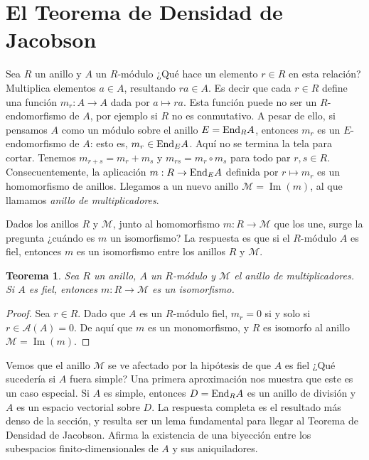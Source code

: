 \documentclass{report}
\newcommand{\End}{\textnormal{End}}
\DeclareMathOperator{\image}{\text{Im}}
\newtheorem{theorem}{Teorema}
\begin{document}
  \section{El Teorema de Densidad de Jacobson}

  Sea \(R\) un anillo y \(A\) un \(R\)-módulo 
  ¿Qué hace un elemento \(r \in R\) en esta relación?
  Multiplica elementos \(a \in A\), resultando \(r a \in A\).
  Es decir que cada \(r \in R\) define una función \(m_r : A \rightarrow A\) dada por \(a \mapsto r a\).
  Esta función puede no ser un \(R\)-endomorfismo de \(A\), por ejemplo si \(R\) no es conmutativo.
  A pesar de ello, si pensamos \(A\) como un módulo sobre el anillo \(E = \End_R A\), entonces \(m_r\) es un \(E\)-endomorfismo de \(A\): esto es, \(m_r \in \End_E A\).
  Aquí no se termina la tela para cortar.
  Tenemos \(m_{r + s} = m_r + m_s\) y \(m_{r s} = m_r \circ m_s\) para todo par \(r, s \in R\).
  Consecuentemente, la aplicación \(m : R \rightarrow \End_E A\) definida por \(r \mapsto m_r\) es un homomorfismo de anillos.
  Llegamos a un nuevo anillo \(\mathcal{M} = \image(m)\), al que llamamos \emph{anillo de multiplicadores}.

  Dados los anillos \(R\) y \(\mathcal{M}\), junto al homomorfismo \(m : R \rightarrow \mathcal{M}\) que los une, surge la pregunta
  ¿cuándo es \(m\) un isomorfismo?
  La respuesta es que si el \(R\)-módulo \(A\) es fiel, entonces \(m\) es un isomorfismo entre los anillos \(R\) y \(\mathcal{M}\).

  \begin{theorem}\label{theorem:multiplierIsomorphism}
    Sea \(R\) un anillo, \(A\) un \(R\)-módulo y \(\mathcal{M}\) el anillo de multiplicadores.
    Si \(A\) es fiel, entonces \(m : R \rightarrow \mathcal{M}\) es un isomorfismo.
  \end{theorem}
  \begin{proof}
    Sea \(r \in R\).
    Dado que \(A\) es un \(R\)-módulo fiel, \(m_r = 0\) si y solo si \(r \in \mathcal{A}(A) = 0\).
    De aquí que \(m\) es un monomorfismo, y \(R\) es isomorfo al anillo \(\mathcal{M} = \image(m)\).
  \end{proof}

  Vemos que el anillo \(\mathcal{M}\) se ve afectado por la hipótesis de que \(A\) es fiel
  ¿Qué sucedería si \(A\) fuera simple?
  Una primera aproximación nos muestra que este es un caso especial.
  Si \(A\) es simple, entonces \(D = \End_R A\) es un anillo de división y \(A\) es un espacio vectorial sobre \(D\).
  La respuesta completa es el resultado más denso de la sección, y resulta ser un lema fundamental para llegar al Teorema de Densidad de Jacobson.
  Afirma la existencia de una biyección entre los subespacios finito-dimensionales de \(A\) y sus aniquiladores.
\end{document}

